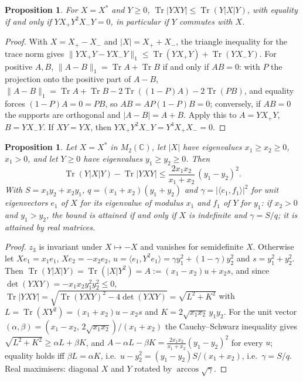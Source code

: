 \documentclass[11pt]{article}
\DeclareMathOperator{\Tr}{Tr}
\newcommand{\C}{\mathbb{C}}
\theoremstyle{plain}
\newtheorem{proposition}[theorem]{Proposition}
\theoremstyle{definition}
\theoremstyle{remark}
\begin{document}
\begin{proposition}\label{prop:exp3eq}
For $X=X^*$ and $Y\ge0$, $\Tr|YXY|\le\Tr(Y|X|Y)$, with equality if and only if $YX_+Y^2X_-Y=0$, in particular if $Y$
commutes with $X$.
\end{proposition}
\begin{proof}
With $X=X_+-X_-$ and $|X|=X_++X_-$, the triangle inequality for the trace norm gives
$\|YX_+Y-YX_-Y\|_1\le\Tr(YX_+Y)+\Tr(YX_-Y)$. For positive $A,B$, $\|A-B\|_1=\Tr A+\Tr B$ if and only if $AB=0$: with $P$
the projection onto the positive part of $A-B$, $\|A-B\|_1=\Tr A+\Tr B-2\Tr((1-P)A)-2\Tr(PB)$, and equality forces
$(1-P)A=0=PB$, so $AB=AP(1-P)B=0$; conversely, if $AB=0$ the supports are orthogonal and $|A-B|=A+B$. Apply this to
$A=YX_+Y$, $B=YX_-Y$. If $XY=YX$, then $YX_+Y^2X_-Y=Y^4X_+X_-=0$.
\end{proof}

\begin{proposition}\label{prop:k2b}
Let $X=X^*$ in $M_2(\C)$, let $|X|$ have eigenvalues $x_1\ge x_2\ge0$, $x_1>0$, and let $Y\ge0$ have eigenvalues
$y_1\ge y_2\ge0$. Then
\[
  \Tr(Y|X|Y)-\Tr|YXY|\le\frac{2x_1x_2}{x_1+x_2}\,(y_1-y_2)^2 .
\]
With $S=x_1y_2+x_2y_1$, $q=(x_1+x_2)(y_1+y_2)$ and $\gamma=|\langle e_1,f_1\rangle|^2$ for unit eigenvectors $e_1$ of $X$
for its eigenvalue of modulus $x_1$ and $f_1$ of $Y$ for $y_1$: if $x_2>0$ and $y_1>y_2$, the bound is attained if and only
if $X$ is indefinite and $\gamma=S/q$; it is attained by real matrices.
\end{proposition}
\begin{proof}
$z_3$ is invariant under $X\mapsto-X$ and vanishes for semidefinite $X$. Otherwise let $Xe_1=x_1e_1$, $Xe_2=-x_2e_2$,
$u=\langle e_1,Y^2e_1\rangle=\gamma y_1^2+(1-\gamma)y_2^2$ and $s=y_1^2+y_2^2$. Then $\Tr(Y|X|Y)=\Tr(|X|Y^2)=A:=(x_1-x_2)u+x_2s$,
and since $\det(YXY)=-x_1x_2y_1^2y_2^2\le0$, $\Tr|YXY|=\sqrt{\Tr(YXY)^2-4\det(YXY)}=\sqrt{L^2+K^2}$ with
$L=\Tr(XY^2)=(x_1+x_2)u-x_2s$ and $K=2\sqrt{x_1x_2}\,y_1y_2$. For the unit vector
$(\alpha,\beta)=(x_1-x_2,\,2\sqrt{x_1x_2})/(x_1+x_2)$ the Cauchy--Schwarz inequality gives $\sqrt{L^2+K^2}\ge\alpha L+\beta K$,
and $A-\alpha L-\beta K=\frac{2x_1x_2}{x_1+x_2}(y_1-y_2)^2$ for every $u$; equality holds iff $\beta L=\alpha K$, i.e.\
$u-y_2^2=(y_1-y_2)S/(x_1+x_2)$, i.e.\ $\gamma=S/q$. Real maximisers: diagonal $X$ and $Y$ rotated by $\arccos\sqrt\gamma$.
\end{proof}
\end{document}
